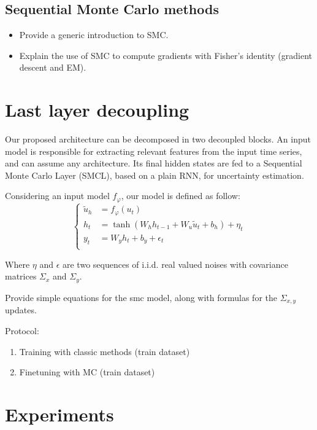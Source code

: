 \documentclass{article}
\begin{document}
\subsection{Sequential Monte Carlo methods}
\label{sec:background:smc}
\begin{itemize}
	\item Provide a generic introduction to SMC.
	\item Explain the use of SMC to compute gradients with Fisher's identity (gradient descent and EM).
\end{itemize}

\section{Last layer decoupling}
\label{sec:decoupling}
Our proposed architecture can be decomposed in two decoupled blocks.
An input model is responsible for extracting relevant features from the input time series, and can assume any architecture.
Its final hidden states are fed to a Sequential Monte Carlo Layer (SMCL), based on a plain RNN, for uncertainty estimation.

Considering an input model $f_\varphi$, our model is defined as follow:
\begin{equation*}
	\left\{
	\begin{aligned}
		\tilde u_h & = f_\varphi(u_t)                                     \\
		h_t        & = \tanh(W_h h_{t-1} + W_u \tilde u_t + b_h) + \eta_t \\
		y_t        & = W_y h_t + b_y + \epsilon_t                         \\
	\end{aligned}
	\right.
\end{equation*}

Where $\eta$ and $\epsilon$ are two sequences of i.i.d. real valued noises with covariance matrices $\Sigma_x$ and $\Sigma_y$.

Provide simple equations for the smc model, along with formulas for the $\Sigma_{x, y}$ updates.

Protocol:
\begin{enumerate}
	\item Training with classic methods (train dataset)
	\item Finetuning with MC (train dataset)
\end{enumerate}

\section{Experiments}
\label{sec:exp}
\end{document}
